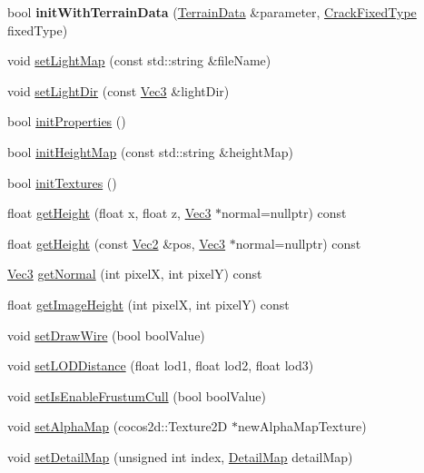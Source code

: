 \begin{DoxyCompactItemize}
bool {\bfseries init\+With\+Terrain\+Data} (\hyperlink{structTerrain_1_1TerrainData}{Terrain\+Data} \&parameter, \hyperlink{classTerrain_af3dc2d6c44474fdbd9552d69e553ef93}{Crack\+Fixed\+Type} fixed\+Type)
\item 
void \hyperlink{classTerrain_a296f207c5fae616a75099156ef8cd0ac}{set\+Light\+Map} (const std\+::string \&file\+Name)
\item 
void \hyperlink{classTerrain_a4fb4d880c5033dcbf89f69ceddf5f8b0}{set\+Light\+Dir} (const \hyperlink{classVec3}{Vec3} \&light\+Dir)
\item 
bool \hyperlink{classTerrain_ac568863efe254e443ea7dfdf7be4113b}{init\+Properties} ()
\item 
bool \hyperlink{classTerrain_a4217303ce95e5a1d0d591dd2ce178623}{init\+Height\+Map} (const std\+::string \&height\+Map)
\item 
bool \hyperlink{classTerrain_af88878ee2f37979ede7656062e19190f}{init\+Textures} ()
\item 
float \hyperlink{classTerrain_ace35b0aef83e27883476dfb44bf473aa}{get\+Height} (float x, float z, \hyperlink{classVec3}{Vec3} $\ast$normal=nullptr) const
\item 
float \hyperlink{classTerrain_ada6082bfb0b0dabc5f6c2e37b984a77e}{get\+Height} (const \hyperlink{classVec2}{Vec2} \&pos, \hyperlink{classVec3}{Vec3} $\ast$normal=nullptr) const
\item 
\hyperlink{classVec3}{Vec3} \hyperlink{classTerrain_a02f6d646b6171329077453c7a67eb4bd}{get\+Normal} (int pixelX, int pixelY) const
\item 
float \hyperlink{classTerrain_adbe691cc944f4d85745e2ab1f1f4f8ff}{get\+Image\+Height} (int pixelX, int pixelY) const
\item 
void \hyperlink{classTerrain_ae29ad24c1f6056a45dd8fafb480bdff8}{set\+Draw\+Wire} (bool bool\+Value)
\item 
void \hyperlink{classTerrain_acffb1ca57d78d5aa643281d34bf0bf1b}{set\+L\+O\+D\+Distance} (float lod1, float lod2, float lod3)
\item 
void \hyperlink{classTerrain_a27509ae8fd97c911b44f3f21d37761e1}{set\+Is\+Enable\+Frustum\+Cull} (bool bool\+Value)
\item 
void \hyperlink{classTerrain_a10a40e89dd343591a43ab2a1069cef54}{set\+Alpha\+Map} (cocos2d\+::\+Texture2D $\ast$new\+Alpha\+Map\+Texture)
\item 
void \hyperlink{classTerrain_a13ab12df5850aab66f6f45e396c4f169}{set\+Detail\+Map} (unsigned int index, \hyperlink{structTerrain_1_1DetailMap}{Detail\+Map} detail\+Map)

\end{DoxyCompactItemize}
